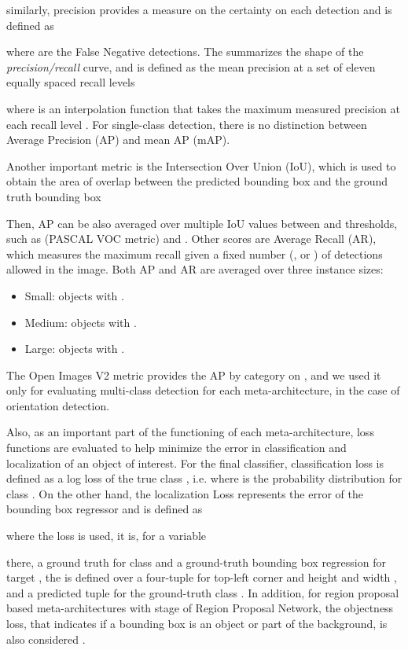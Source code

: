 \documentclass[journal]{IEEEtran}
\begin{document}
similarly, precision  provides a measure on the certainty on each detection and is defined as

where  are the False Negative detections. The  summarizes the shape of the \textit{precision/recall} curve, and is defined as the mean precision at a set of eleven equally spaced recall levels  

where  is an interpolation function that takes the maximum measured precision at each recall level \cite{PASCAL}. For single-class detection, there is no distinction between Average Precision (AP) and mean AP (mAP). 

Another important metric is the Intersection Over Union (IoU), which is used to obtain the area of overlap between the predicted bounding box  and the ground truth bounding box 

Then, AP can be also averaged over multiple IoU values between  and  thresholds, such as  (PASCAL VOC metric) and . Other scores are Average Recall (AR), which measures the maximum recall given a fixed number (,  or ) of detections allowed in the image. Both AP and AR are averaged over three instance sizes: 
\begin{itemize}
  \item Small: objects with .
  \item Medium: objects with .
  \item Large: objects with .
\end{itemize}

The Open Images V2 metric provides the AP by category on , and we used it only for evaluating multi-class detection for each meta-architecture, in the case of orientation detection. 

Also, as an important part of the functioning of each meta-architecture, loss functions are evaluated to help minimize the error in classification and localization of an object of interest. For the final classifier, classification loss  is defined as a log loss of the true class  \cite{girshick2015fast}, i.e. 
where  is the probability distribution for class . On the other hand, the localization Loss  represents the error of the bounding box regressor and is defined as
 
where the  loss is used, it is,  for a variable 

there, a ground truth for class  and a ground-truth bounding box regression for target , the  is defined over a four-tuple  for top-left corner  and height and width , and a predicted tuple  for the ground-truth class . In addition, for region proposal based meta-architectures with stage of Region Proposal Network, the objectness loss, that indicates if a bounding box is an object or part of the background, is also considered \cite{fasterObject2015}.
\end{document}
